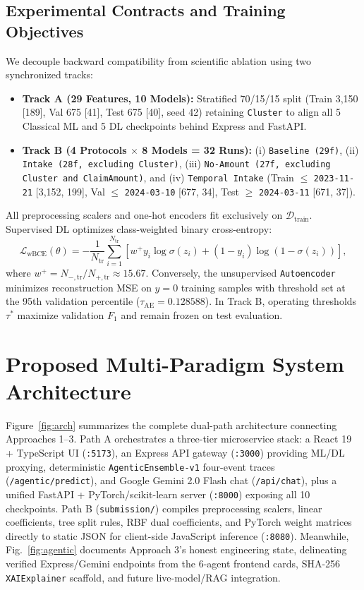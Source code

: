 \documentclass[conference]{IEEEtran}
\begin{document}
\subsection{Experimental Contracts and Training Objectives}
We decouple backward compatibility from scientific ablation using two synchronized tracks:
\begin{itemize}
    \item \textbf{Track A (29 Features, 10 Models):} Stratified 70/15/15 split (Train 3,150 [189], Val 675 [41], Test 675 [40], seed 42) retaining \texttt{Cluster} to align all 5 Classical ML and 5 DL checkpoints behind Express and FastAPI.
    \item \textbf{Track B (4 Protocols $\times$ 8 Models = 32 Runs):}
    (i) \texttt{Baseline (29f)}, (ii) \texttt{Intake (28f, excluding Cluster)}, (iii) \texttt{No-Amount (27f, excluding Cluster and ClaimAmount)}, and (iv) \texttt{Temporal Intake} (Train $\le$ \texttt{2023-11-21} [3,152, 199], Val $\le$ \texttt{2024-03-10} [677, 34], Test $\ge$ \texttt{2024-03-11} [671, 37]).
\end{itemize}

All preprocessing scalers and one-hot encoders fit exclusively on $\mathcal{D}_{\text{train}}$. Supervised DL optimizes class-weighted binary cross-entropy:
\begin{equation}
\mathcal{L}_{\text{wBCE}}(\theta) = -\frac{1}{N_{\text{tr}}} \sum_{i=1}^{N_{\text{tr}}} \left[ w^+ y_i \log \sigma(z_i) + (1 - y_i)\log(1 - \sigma(z_i)) \right],
\end{equation}
where $w^+ = N_{-,\text{tr}} / N_{+,\text{tr}} \approx 15.67$. Conversely, the unsupervised \texttt{Autoencoder} minimizes reconstruction MSE on $y=0$ training samples with threshold set at the 95th validation percentile ($\tau_{\text{AE}} = 0.128588$). In Track B, operating thresholds $\tau^*$ maximize validation $F_1$ and remain frozen on test evaluation.

\section{Proposed Multi-Paradigm System Architecture}
Figure~\ref{fig:arch} summarizes the complete dual-path architecture connecting Approaches 1--3. Path A orchestrates a three-tier microservice stack: a React 19 + TypeScript UI (\texttt{:5173}), an Express API gateway (\texttt{:3000}) providing ML/DL proxying, deterministic \texttt{AgenticEnsemble-v1} four-event traces (\texttt{/agentic/predict}), and Google Gemini 2.0 Flash chat (\texttt{/api/chat}), plus a unified FastAPI + PyTorch/scikit-learn server (\texttt{:8000}) exposing all 10 checkpoints. Path B (\texttt{submission/}) compiles preprocessing scalers, linear coefficients, tree split rules, RBF dual coefficients, and PyTorch weight matrices directly to static JSON for client-side JavaScript inference (\texttt{:8080}). Meanwhile, Fig.~\ref{fig:agentic} documents Approach 3's honest engineering state, delineating verified Express/Gemini endpoints from the 6-agent frontend cards, SHA-256 \texttt{XAIExplainer} scaffold, and future live-model/RAG integration.
\end{document}
